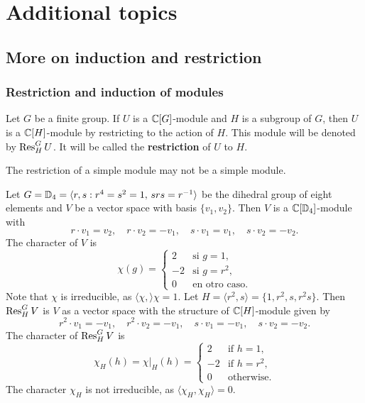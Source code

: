 \chapter*{Additional topics}

\pagestyle{plain}
\fancyhf{}
\fancyfoot[CE,CO]{\leftmark}
\fancyfoot[LE,RO]{\thepage}


\section{More on induction and restriction}

\subsection*{Restriction and induction of modules}

\begin{definition}
    Let $G$ be a finite group. 
    If $U$ is a $\mathbb{C}[G]$-module and $H$ is a subgroup of $G$, 
    then $U$ is a $\mathbb{C}[H]$-module by restricting to the action of $H$.  
    This module will be denoted by $\operatorname{Res}_H^GU$. It will be called
    the \textbf{restriction} of $U$ to $H$.
\end{definition}

The restriction of a simple module may not be a simple module. 

\begin{example}
    Let $G=\mathbb{D}_4=\langle r,s:r^4=s^2=1,\,srs=r^{-1}\rangle$ be the dihedral
    group of eight elements and 
    $V$ be a vector space with basis $\{v_1,v_2\}$. Then 
    $V$ is a $\mathbb{C}[\mathbb{D}_4]$-module with 
    \[
    r\cdot v_1=v_2,\quad
    r\cdot v_2=-v_1,\quad
    s\cdot v_1=v_1,\quad
    s\cdot v_2=-v_2.
    \]
    The character of $V$ is 
    \[
    \chi(g)=\begin{cases}
    2 & \text{si $g=1$},\\
    -2 & \text{si $g=r^2$},\\
    0 & \text{en otro caso}.
    \end{cases}
    \]
    Note that $\chi$ is irreducible, as $\langle\chi,\rangle\chi=1$.
    Let 
    $H=\langle r^2,s\rangle=\{1,r^2,s,r^2s\}$. Then $\operatorname{Res}_H^GV$ is $V$ as
    a vector space with the structure of 
    $\mathbb{C}[H]$-module given by 
    \[
    r^2\cdot v_1=-v_1,\quad
    r^2\cdot v_2=-v_1,\quad
    s\cdot v_1=-v_1,\quad
    s\cdot v_2=-v_2.
    \]
    The character of $\operatorname{Res}_H^GV$ is
    \[
    \chi_H(h)=\chi|_H(h)
    =\begin{cases}
    2 & \text{if $h=1$},\\
    -2 & \text{if $h=r^2$},\\
    0 & \text{otherwise}.
    \end{cases}
    \]
    The character $\chi_H$ is not irreducible, as 
    $\langle\chi_H,\chi_H\rangle=0$. 
\end{example}

